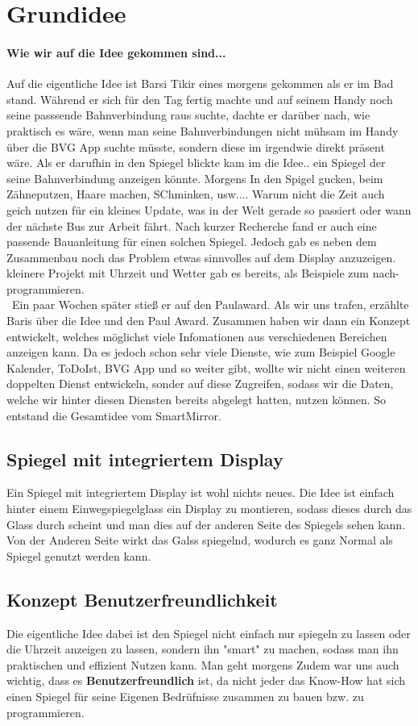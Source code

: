 \section{Grundidee}
\paragraph{Wie wir auf die Idee gekommen sind...}
Auf die eigentliche Idee ist Barsi Tikir eines morgens gekommen als er im Bad stand. Während er sich für den Tag fertig machte und auf seinem Handy noch seine passsende Bahnverbindung raus suchte, dachte er darüber nach, wie praktisch es wäre, wenn man seine Bahnverbindungen nicht mühsam im Handy über die BVG App suchte müsste, sondern diese im irgendwie direkt präsent wäre. Als er darufhin in den Spiegel blickte kam im die Idee.. ein Spiegel  der seine Bahnverbindung anzeigen könnte. Morgens In den Spigel gucken, beim Zähneputzen, Haare machen, SChminken, usw.... Warum nicht die Zeit auch geich nutzen für ein kleines Update, was in der Welt gerade so passiert oder wann der nächste Bus zur Arbeit fährt. Nach kurzer Recherche fand er auch eine passende Bauanleitung für einen solchen Spiegel. Jedoch gab es neben dem Zusammenbau noch das Problem etwas  sinnvolles auf dem Display anzuzeigen. kleinere Projekt mit Uhrzeit und Wetter gab es bereits, als Beispiele zum nach-programmieren. 
\\\
Ein paar Wochen später stieß er auf den Paulaward. Als wir uns trafen, erzählte Baris über die Idee und den Paul Award. Zusammen haben wir dann ein Konzept entwickelt, welches möglichst viele Infomationen aus verschiedenen Bereichen anzeigen kann. Da es jedoch schon sehr viele Dienste, wie zum Beispiel Google Kalender, ToDoIst, BVG App und so weiter gibt, wollte wir nicht einen weiteren doppelten Dienst entwickeln, sonder auf diese Zugreifen, sodass wir die Daten, welche wir hinter diesen Diensten bereits abgelegt hatten, nutzen können. So entstand die Gesamtidee vom SmartMirror.

\subsection{Spiegel mit integriertem Display}
Ein Spiegel mit integriertem Display ist wohl nichts neues. Die Idee ist einfach hinter einem Einwegspiegelglass ein Display zu montieren, sodass dieses durch das Glass durch scheint und man dies auf der anderen Seite des Spiegels sehen kann. Von der Anderen Seite wirkt das Galss spiegelnd, wodurch es ganz Normal als Spiegel genutzt werden kann.
\subsection{Konzept Benutzerfreundlichkeit}
Die eigentliche Idee dabei ist den Spiegel nicht einfach nur spiegeln zu lassen oder die Uhrzeit anzeigen zu lassen, sondern ihn "smart" zu machen, sodass man ihn praktischen und effizient Nutzen kann. Man geht morgens Zudem war uns auch wichtig, dass es \textbf{Benutzerfreundlich} ist, da nicht jeder das Know-How hat sich einen Spiegel für seine Eigenen Bedrüfnisse zusammen zu bauen bzw. zu programmieren.